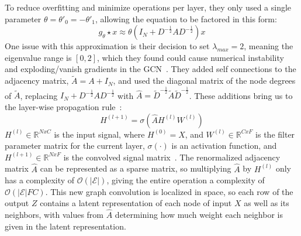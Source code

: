 To reduce overfitting and minimize operations per layer, they only used a single parameter $\theta = \theta'_0 = -\theta'_1$, allowing the equation to be factored in this form:
\begin{equation}
\label{single_param}
g_\theta \star x \approx \theta(I_N + D^{-\frac{1}{2}}AD^{-\frac{1}{2}})x
\end{equation}
One issue with this approximation is their decision to set $\lambda_{max} = 2$, meaning the eigenvalue range is $[0,2]$, which they found could cause numerical instability and exploding/vanish gradients in the GCN~\cite{Kipf2016}. They added self connections to the adjacency matrix, $\tilde{A} = A + I_N$, and used the diagonal matrix of the node degrees of $\tilde{A}$, replacing $I_N + D^{-\frac{1}{2}}AD^{-\frac{1}{2}}$ with $\hat{A} = \tilde{D}^{-\frac{1}{2}}\tilde{A}\tilde{D}^{-\frac{1}{2}}$. These additions bring us to the layer-wise propagation rule~\cite{Kipf2016}:
\begin{equation}
\label{prop_rule}
H^{(l+1)} = \sigma(\hat{A}H^{(l)}W^{(l)})
\end{equation}
$H^{(l)} \in \mathbb{R}^{N x C}$ is the input signal, where $H^{(0)} = X$, and $W^{(l)} \in \mathbb{R}^{C x F}$ is the filter parameter matrix for the current layer, $\sigma(\cdot)$ is an activation function, and $H^{(l+1)} \in \mathbb{R}^{N x F}$ is the convolved signal matrix~\cite{Kipf2016}. The renormalized adjacency matrix $\hat{A}$ can be represented as a sparse matrix, so multiplying $\hat{A}$ by $H^{(l)}$ only has a complexity of $\mathcal{O}(|\mathcal{E}|)$, giving the entire operation a complexity of $\mathcal{O}(|\mathcal{E}|FC)$.  This new graph convolution is localized in space, so each row of the output $Z$ contains a latent representation of each node of input $X$ as well as its neighbors, with values from $\hat{A}$ determining how much weight each neighbor is given in the latent representation.

